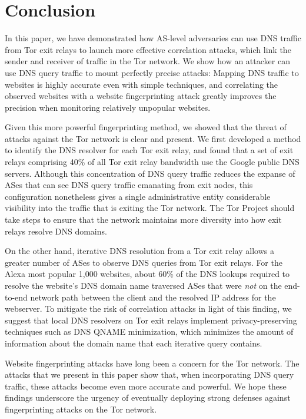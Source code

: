 \section{Conclusion}
\label{sec:conclusion}

In this paper, we have demonstrated how AS-level adversaries can use DNS
traffic from Tor exit relays to launch more effective correlation
attacks, which link the sender and receiver of traffic in the Tor
network.  We show how an attacker can use DNS query traffic to mount
perfectly precise \name attacks: Mapping DNS traffic to websites is highly
accurate even with simple techniques, and correlating the observed websites
with a website fingerprinting attack greatly improves the precision when
monitoring relatively unpopular websites. 

Given this more powerful fingerprinting method, we showed that the
threat of \name attacks against the Tor network is clear and present. We
first developed a method to identify the DNS resolver for each Tor exit relay,
and found that a set of exit relays comprising 40\% of all Tor exit
relay bandwidth use the Google public DNS servers. Although this
concentration of DNS query traffic reduces the expanse of ASes that can
see DNS query traffic emanating from exit nodes, this configuration
nonetheless gives a single administrative entity considerable visibility
into the traffic that is exiting the Tor network. The Tor Project should
take steps to ensure that the network maintains more diversity into how
exit relays resolve DNS domains.

On the other hand, iterative DNS resolution from a Tor exit relay allows
a greater number of ASes to observe DNS queries from Tor exit relays.
For the Alexa most popular 1,000 websites, about 60\% of the DNS lookups
required to resolve the website's DNS domain name traversed ASes that
were {\em not} on the end-to-end network path between the client and the
resolved IP address for the webserver.  To mitigate the risk of
correlation attacks in light of this finding, we suggest that local DNS
resolvers on Tor exit relays implement privacy-preserving techniques
such as DNS QNAME minimization, which minimizes the amount of
information about the domain name that each iterative query contains.

Website fingerprinting attacks have long been a concern for the Tor
network. The attacks that we present in this paper show that, when
incorporating DNS query traffic, these attacks become even more accurate
and powerful. We hope these findings underscore the urgency of
eventually deploying strong defenses against fingerprinting attacks on
the Tor network.
